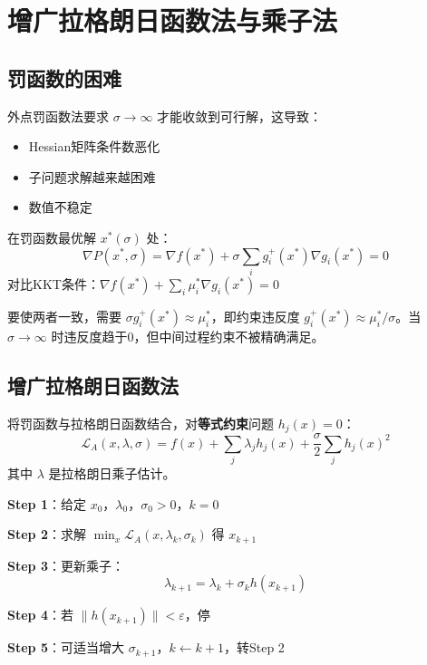 \section{增广拉格朗日函数法与乘子法}\label{sec:augmented-lagrangian}

\subsection{罚函数的困难}

外点罚函数法要求 $\sigma \to \infty$ 才能收敛到可行解，这导致：
\begin{itemize}
    \item Hessian矩阵条件数恶化
    \item 子问题求解越来越困难
    \item 数值不稳定
\end{itemize}

\begin{notebox}[关键观察]
在罚函数最优解 $x^*(\sigma)$ 处：
\[
\nabla P(x^*, \sigma) = \nabla f(x^*) + \sigma \sum_{i} g_i^+(x^*) \nabla g_i(x^*) = 0
\]
对比KKT条件：$\nabla f(x^*) + \sum_i \mu_i^* \nabla g_i(x^*) = 0$

要使两者一致，需要 $\sigma g_i^+(x^*) \approx \mu_i^*$，即约束违反度 $g_i^+(x^*) \approx \mu_i^*/\sigma$。当 $\sigma \to \infty$ 时违反度趋于0，但中间过程约束不被精确满足。
\end{notebox}

\subsection{增广拉格朗日函数法}

\begin{conceptbox}[增广拉格朗日函数]
将罚函数与拉格朗日函数结合，对\textbf{等式约束}问题 $h_j(x) = 0$：
\[
\mathcal{L}_A(x, \lambda, \sigma) = f(x) + \sum_j \lambda_j h_j(x) + \frac{\sigma}{2}\sum_j h_j(x)^2
\]
其中 $\lambda$ 是拉格朗日乘子估计。
\end{conceptbox}

\begin{algobox}
\textbf{Step 1}：给定 $x_0$，$\lambda_0$，$\sigma_0 > 0$，$k = 0$

\textbf{Step 2}：求解 $\min_x \mathcal{L}_A(x, \lambda_k, \sigma_k)$ 得 $x_{k+1}$

\textbf{Step 3}：更新乘子：
\[
\lambda_{k+1} = \lambda_k + \sigma_k h(x_{k+1})
\]

\textbf{Step 4}：若 $\|h(x_{k+1})\| < \varepsilon$，停

\textbf{Step 5}：可适当增大 $\sigma_{k+1}$，$k \leftarrow k+1$，转Step 2
\end{algobox}

